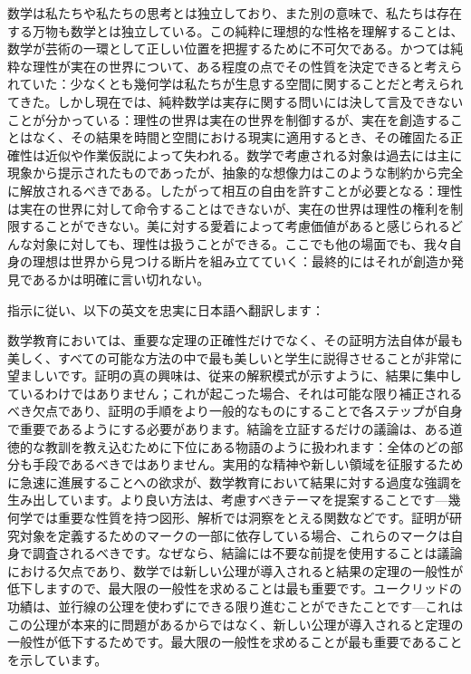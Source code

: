 \documentclass[a4paper,11pt,openany]{ltjsbook}
\begin{document}
数学は私たちや私たちの思考とは独立しており、また別の意味で、私たちは存在する万物も数学とは独立している。この純粋に理想的な性格を理解することは、数学が芸術の一環として正しい位置を把握するために不可欠である。かつては純粋な理性が実在の世界について、ある程度の点でその性質を決定できると考えられていた：少なくとも幾何学は私たちが生息する空間に関することだと考えられてきた。しかし現在では、純粋数学は実存に関する問いには決して言及できないことが分かっている：理性の世界は実在の世界を制御するが、実在を創造することはなく、その結果を時間と空間における現実に適用するとき、その確固たる正確性は近似や作業仮説によって失われる。数学で考慮される対象は過去には主に現象から提示されたものであったが、抽象的な想像力はこのような制約から完全に解放されるべきである。したがって相互の自由を許すことが必要となる：理性は実在の世界に対して命令することはできないが、実在の世界は理性の権利を制限することができない。美に対する愛着によって考慮価値があると感じられるどんな対象に対しても、理性は扱うことができる。ここでも他の場面でも、我々自身の理想は世界から見つける断片を組み立てていく：最終的にはそれが創造か発見であるかは明確に言い切れない。

指示に従い、以下の英文を忠実に日本語へ翻訳します：

数学教育においては、重要な定理の正確性だけでなく、その証明方法自体が最も美しく、すべての可能な方法の中で最も美しいと学生に説得させることが非常に望ましいです。証明の真の興味は、従来の解釈模式が示すように、結果に集中しているわけではありません；これが起こった場合、それは可能な限り補正されるべき欠点であり、証明の手順をより一般的なものにすることで各ステップが自身で重要であるようにする必要があります。結論を立証するだけの議論は、ある道徳的な教訓を教え込むために下位にある物語のように扱われます：全体のどの部分も手段であるべきではありません。実用的な精神や新しい領域を征服するために急速に進展することへの欲求が、数学教育において結果に対する過度な強調を生み出しています。より良い方法は、考慮すべきテーマを提案することです—幾何学では重要な性質を持つ図形、解析では洞察をとえる関数などです。証明が研究対象を定義するためのマークの一部に依存している場合、これらのマークは自身で調査されるべきです。なぜなら、結論には不要な前提を使用することは議論における欠点であり、数学では新しい公理が導入されると結果の定理の一般性が低下しますので、最大限の一般性を求めることは最も重要です。ユークリッドの功績は、並行線の公理を使わずにできる限り進むことができたことです—これはこの公理が本来的に問題があるからではなく、新しい公理が導入されると定理の一般性が低下するためです。最大限の一般性を求めることが最も重要であることを示しています。
\end{document}
